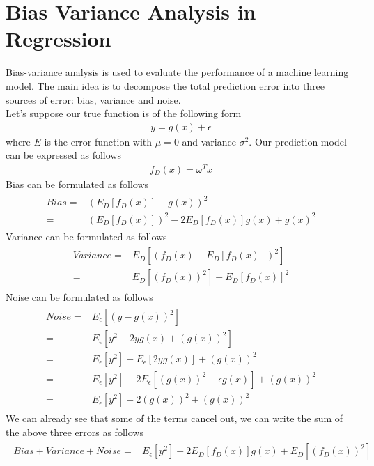 \documentclass[12pt]{article}
\begin{document}
\section{Bias Variance Analysis in Regression}
Bias-variance analysis is used to evaluate the performance of a machine learning model. The main idea is to decompose the total prediction error into three sources of error: bias, variance and noise. \\ Let's suppose our true function is of the following form
\begin{align}
    y = g(x)+\epsilon
\end{align}
where $E$ is the error function with $\mu=0$ and variance $\sigma^2$. Our prediction model can be expressed as follows
\begin{align}
    f_D(x) = \omega^Tx
\end{align}
Bias can be formulated as follows\\ 
\begin{align}
\begin{split}\label{eq:1}
    Bias ={}& \left(E_{D}[f_D(x)]-g(x)\right)^2 \\
    ={}& (E_{D}[f_D(x)])^2 - 2E_{D}[f_D(x)]g(x) + g(x)^2
\end{split}
\end{align}
Variance can be formulated as follows
\begin{align}
\begin{split}\label{eq:2}
    Variance ={}& E_{D}[(f_D(x)-E_D[f_D(x)])^2]\\
    ={}& E_D[(f_D(x))^2]-E_D[f_D(x)]^2
\end{split}
\end{align}
Noise can be formulated as follows
\begin{align}
\begin{split}\label{eq:3}
    Noise ={}& E_{\epsilon}[(y-g(x))^2] \\
    ={}& E_{\epsilon}[y^2 - 2yg(x) + (g(x))^2] \\
    ={}& E_{\epsilon}[y^2] - E_{\epsilon}[2yg(x)] + (g(x))^2 \\
    ={}& E_{\epsilon}[y^2] - 2E_{\epsilon}[(g(x))^2 + \epsilon g(x)] + (g(x))^2 \\
    ={}& E_{\epsilon}[y^2] - 2(g(x))^2 + (g(x))^2
\end{split}
\end{align}
We can already see that some of the terms cancel out, we can write the sum of the above three errors as follows
\begin{align}
\begin{split}\label{eq:4}
    Bias + Variance + Noise ={}& E_{\epsilon}[y^2] - 2E_{D}[f_D(x)]g(x) + E_{D}[(f_D(x))^2]
\end{split}
\end{align}
\end{document}
